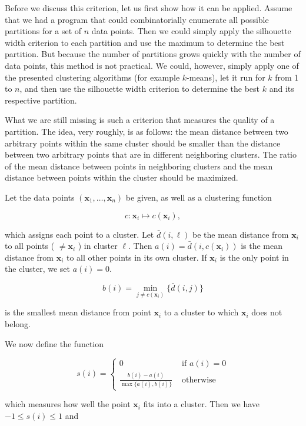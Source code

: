 \documentclass[10pt]{book}
\begin{document}
Before we discuss this criterion, let us first show how it can be applied. Assume that we had a program that could combinatorially enumerate all possible partitions for a set of $n$ data points. Then we could simply apply the silhouette width criterion to each partition and use the maximum to determine the best partition. But because the number of partitions grows quickly with the number of data points, this method is not practical. We could, however, simply apply one of the presented clustering algorithms (for example $k$-means), let it run for $k$ from 1 to $n$, and then use the silhouette width criterion to determine the best $k$ and its respective partition.

What we are still missing is such a criterion that measures the quality of a partition. The idea, very roughly, is as follows: the mean distance between two arbitrary points within the same cluster should be smaller than the distance between two arbitrary points that are in different neighboring clusters. The ratio of the mean distance between points in neighboring clusters and the mean distance between points within the cluster should be maximized.

Let the data points $\left(\boldsymbol{x}_{1}, \ldots, \boldsymbol{x}_{n}\right)$ be given, as well as a clustering function

$$
c: \boldsymbol{x}_{i} \mapsto c\left(\boldsymbol{x}_{i}\right),
$$

which assigns each point to a cluster. Let $\bar{d}(i, \ell)$ be the mean distance from $\boldsymbol{x}_{i}$ to all points ( $\neq \boldsymbol{x}_{i}$ ) in cluster $\ell$. Then $a(i)=\bar{d}\left(i, c\left(\boldsymbol{x}_{i}\right)\right)$ is the mean distance from $\boldsymbol{x}_{i}$ to all other points in its own cluster. If $\boldsymbol{x}_{i}$ is the only point in the cluster, we set $a(i)=0$.

$$
b(i)=\min _{j \neq c\left(\boldsymbol{x}_{i}\right)}\{\bar{d}(i, j)\}
$$

is the smallest mean distance from point $\boldsymbol{x}_{i}$ to a cluster to which $\boldsymbol{x}_{i}$ does not belong.

We now define the function

$$
s(i)=\left\{\begin{array}{cc}
0 & \text { if } a(i)=0 \\
\frac{b(i)-a(i)}{\max \{a(i), b(i)\}} & \text { otherwise }
\end{array}\right.
$$

which measures how well the point $\boldsymbol{x}_{i}$ fits into a cluster. Then we have $-1 \leq s(i) \leq 1$ and
\end{document}
